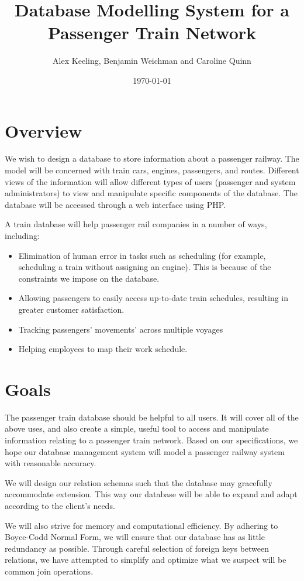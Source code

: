 \documentclass[a4paper]{article}
\title{Database Modelling System for a Passenger Train Network}
\author{Alex Keeling, Benjamin Weichman and Caroline Quinn}
\date{\today}
\begin{document}
\maketitle


\section{Overview}
We wish to design a database to store information about a passenger railway. The model will be concerned with train cars, engines, passengers, and routes. Different views of the information will allow different types of users (passenger and system administrators) to view and manipulate specific components of the database. The database will be accessed through a web interface using PHP. 

A train database will help passenger rail companies in a number of ways, including:

\begin{itemize}
\item{Elimination of human error in tasks such as scheduling (for example, scheduling a train without assigning an engine). This is because of the constraints we impose on the database.}
\item{Allowing passengers to easily access up-to-date train schedules, resulting in greater customer satisfaction. }
\item{Tracking passengers’ movements’ across multiple voyages}
\item{Helping employees to map their work schedule.}
\end{itemize}


\section{Goals}
The passenger train database should be helpful to all users. It will cover all of the above uses, and also create a simple, useful tool to access and manipulate information relating to a passenger train network. Based on our specifications, we hope our database management system will model a passenger railway system with reasonable accuracy. 

We will design our relation schemas such that the database may gracefully accommodate extension. This way our database will be able to expand and adapt according to the client’s needs. 

We will also strive for memory and computational efficiency. By adhering to Boyce-Codd Normal Form, we will ensure that our database has as little redundancy as possible. Through careful selection of foreign keys between relations, we have attempted to simplify and optimize what we suspect will be common join operations.
\end{document}
